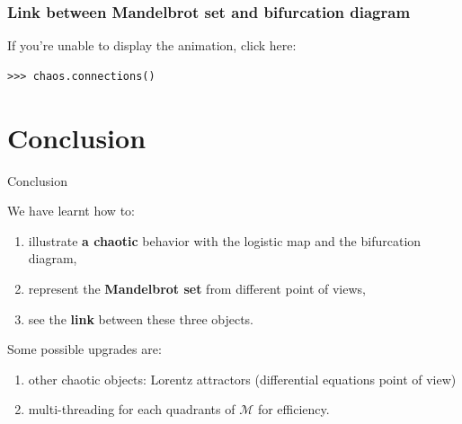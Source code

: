 \documentclass[11pt, compress, tikz]{beamer}
\theoremstyle{definition}
\begin{document}
\begin{frame}[fragile]
\frametitle{Link between Mandelbrot set and bifurcation diagram}
If you're unable to display the animation, click here:
\href{https://www.youtube.com/watch?v=xYQbqML1eE4}{}
\begin{verbatim}
>>> chaos.connections()
\end{verbatim}


\end{frame}

\section[]{Conclusion}
\begin{frame}{Conclusion}
\begin{center}
We have learnt how to:
\end{center}
\begin{box2}{
\begin{enumerate}[label=$\bullet$]
\item illustrate \textbf{a chaotic} behavior with the logistic map and the bifurcation diagram,
\item represent the \textbf{Mandelbrot set} from different point of views,
\item see the \textbf{link} between these three objects.
\end{enumerate}}
\end{box2}
\begin{center}
Some possible upgrades are:
\end{center}
\begin{box2}{
\begin{enumerate}[label=\ding{42}]
\item other chaotic objects: Lorentz attractors (differential equations point of view)
\item multi-threading for each quadrants of $\mathcal{M}$ for efficiency.
\end{enumerate}}
\end{box2}
\end{frame}  
\end{document}
